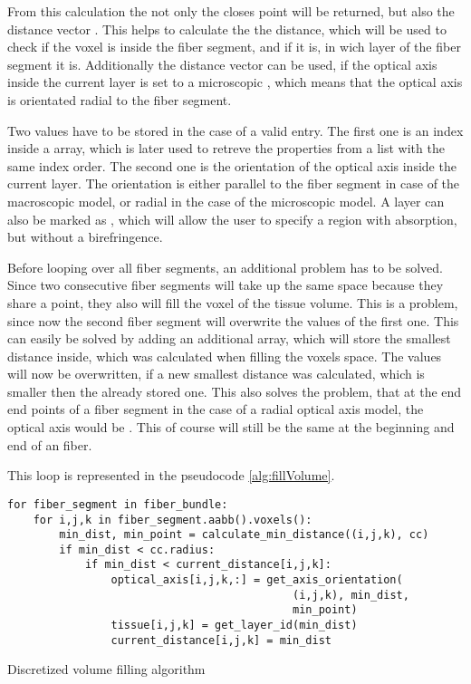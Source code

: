 From this calculation the not only the closes point \dummy{} will be returned, but also the distance vector \dummy{}.
This helps to calculate the the distance, which will be used to check if the voxel is inside the fiber segment, and if it is, in wich layer of the fiber segment it is.
Additionally the distance vector can be used, if the optical axis inside the current layer is set to a microscopic \dummy{}, which means that the optical axis is orientated radial to the fiber segment.
\par
%
Two values have to be stored in the case of a valid entry.
The first one is an index inside a  array, which is later used to retreve the properties from a list with the same index order.
The second one is the orientation of the optical axis inside the current layer.
The orientation is either parallel to the fiber segment in case of the macroscopic model, or radial in the case of the microscopic model.
A layer can also be marked as , which will allow the user to specify a region with absorption, but without a birefringence.
\par
%
Before looping over all fiber segments, an additional problem has to be solved.
Since two consecutive fiber segments will take up the same space because they share a point, they also will fill the voxel of the tissue volume.
This is a problem, since now the second fiber segment will overwrite the values of the first one.
This can easily be solved by adding an additional array, which will store the smallest distance inside, which was calculated when filling the voxels space.
The values will now be overwritten, if a new smallest distance was calculated, which is smaller then the already stored one.
This also solves the problem, that at the end end points of a fiber segment in the case of a radial optical axis model, the optical axis would be .
This of course will still be the same at the beginning and end of an fiber.
\par
%
This  loop is represented in the pseudocode \cref{alg:fillVolume}.
%
\begin{lstfloat}[!tb]
\lstset{style=python}
\begin{lstlisting}[]
for fiber_segment in fiber_bundle:
    for i,j,k in fiber_segment.aabb().voxels():
        min_dist, min_point = calculate_min_distance((i,j,k), cc)
        if min_dist < cc.radius:
            if min_dist < current_distance[i,j,k]:
                optical_axis[i,j,k,:] = get_axis_orientation(
                                            (i,j,k), min_dist,
                                            min_point)
                tissue[i,j,k] = get_layer_id(min_dist)
                current_distance[i,j,k] = min_dist
\end{lstlisting}
\caption{Discretized volume filling algorithm}
\label{alg:fillVolume}
\end{lstfloat}
%
%
%
%
